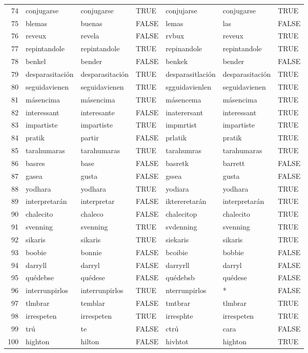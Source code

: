 \documentclass[paper=letter, fontsize=11pt]{scrartcl}
\numberwithin{equation}{section} %
\numberwithin{figure}{section} %
\numberwithin{table}{section} %
\begin{document}
\begin{table}[ht]
\begin{tabular}{rllllll}
  74 & conjugarse & conjugarse & TRUE & conjujarse & conjugarse & TRUE \\ 
  75 & blemas & buenas & FALSE & lemas & las & FALSE \\ 
  76 & reveux & revela & FALSE & rvbux & reveux & TRUE \\ 
  77 & repintandole & repintandole & TRUE & repinandole & repintandole & TRUE \\ 
  78 & benkel & bender & FALSE & benkek & bender & FALSE \\ 
  79 & desparasitación & desparasitación & TRUE & desparasitlación & desparasitación & TRUE \\ 
  80 & seguidavienen & seguidavienen & TRUE & sgguidavienlen & seguidavienen & TRUE \\ 
  81 & másencima & másencima & TRUE & másencema & másencima & TRUE \\ 
  82 & interessant & interesante & FALSE & inaterersant & interessant & TRUE \\ 
  83 & impartiste & impartiste & TRUE & impmrtist & impartiste & TRUE \\ 
  84 & pratik & partir & FALSE & prlatik & pratik & TRUE \\ 
  85 & tarahumaras & tarahumaras & TRUE & tarahumras & tarahumaras & TRUE \\ 
  86 & basres & base & FALSE & basretk & barrett & FALSE \\ 
  87 & gasea & gusta & FALSE & gssea & gusta & FALSE \\ 
  88 & yodhara & yodhara & TRUE & yodiara & yodhara & TRUE \\ 
  89 & interpretarán & interpretar & FALSE & iktereretarán & interpretarán & TRUE \\ 
  90 & chalecito & chaleco & FALSE & chalecitop & chalecito & TRUE \\ 
  91 & svenning & svenning & TRUE & svdenning & svenning & TRUE \\ 
  92 & sikaris & sikaris & TRUE & siekaris & sikaris & TRUE \\ 
  93 & boobie & bonnie & FALSE & bcoibie & bobbie & FALSE \\ 
  94 & darryll & darryl & FALSE & darryrll & darryl & FALSE \\ 
  95 & quédebse & quédese & FALSE & quédebsb & quédese & FALSE \\ 
  96 & interrunpirlos & interrunpirlos & TRUE & nterrunpirlos & * & FALSE \\ 
  97 & tlmbrar & temblar & FALSE & tmtbrar & tlmbrar & TRUE \\ 
  98 & irrespeten & irrespeten & TRUE & irresphte & irrespeten & TRUE \\ 
  99 & trú & te & FALSE & ctrú & cara & FALSE \\ 
  100 & highton & hilton & FALSE & hivhtot & highton & TRUE \\ 
   \hline
\end{tabular}
\end{table}
\FloatBarrier
\end{document}
